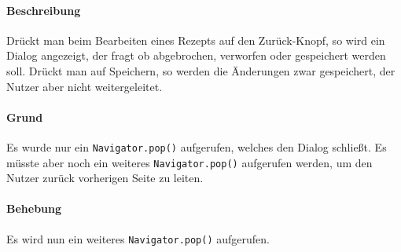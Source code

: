 \documentclass{qualitätssicherungsheft}
\begin{document}
\paragraph*{Beschreibung} Drückt man beim Bearbeiten eines Rezepts auf den Zurück-Knopf, so wird ein Dialog angezeigt, der fragt ob abgebrochen, verworfen oder gespeichert werden soll. Drückt man auf Speichern, so werden die Änderungen zwar gespeichert, der Nutzer aber nicht weitergeleitet.
\paragraph{Grund} Es wurde nur ein \texttt{Navigator.pop()} aufgerufen, welches den Dialog schließt. Es müsste aber noch ein weiteres \texttt{Navigator.pop()} aufgerufen werden, um den Nutzer zurück vorherigen Seite zu leiten.
\paragraph{Behebung} Es wird nun ein weiteres \texttt{Navigator.pop()} aufgerufen.
\newpage
\end{document}
